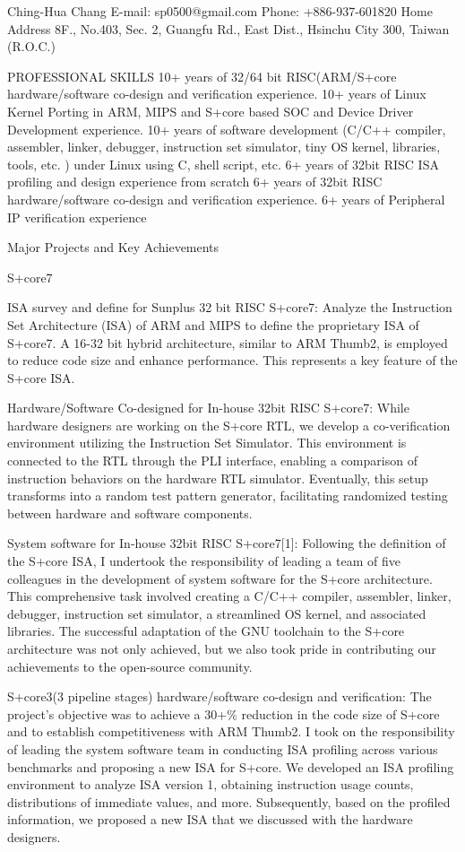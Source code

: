 
Ching-Hua Chang
E-mail: sp0500@gmail.com
Phone: +886-937-601820
Home Address
8F., No.403, Sec. 2, Guangfu Rd., East Dist., Hsinchu City 300, Taiwan (R.O.C.)




PROFESSIONAL SKILLS
10+ years of 32/64 bit RISC(ARM/S+core hardware/software co-design and verification experience.
10+ years of Linux Kernel Porting in ARM, MIPS and S+core based SOC and Device Driver Development experience.
10+ years of software development (C/C++ compiler, assembler, linker, debugger, instruction set simulator, tiny OS kernel, libraries, tools, etc. ) under Linux using C, shell script, etc.
6+ years of 32bit RISC ISA profiling and design experience from scratch
6+ years of 32bit RISC hardware/software co-design and verification experience.
6+ years of Peripheral IP verification experience



Major Projects and Key Achievements

S+core7

ISA survey and define for Sunplus 32 bit RISC S+core7:
Analyze the Instruction Set Architecture (ISA) of ARM and MIPS to define the proprietary ISA of S+core7.
A 16-32 bit hybrid architecture, similar to ARM Thumb2, is employed to reduce code size and enhance performance. This represents a key feature of the S+core ISA.


Hardware/Software Co-designed for In-house 32bit RISC S+core7:
While hardware designers are working on the S+core RTL, we develop a co-verification environment utilizing the Instruction Set Simulator.
This environment is connected to the RTL through the PLI interface, enabling a comparison of instruction behaviors on the hardware RTL simulator.
Eventually, this setup transforms into a random test pattern generator, facilitating randomized testing between hardware and software components.

System software for In-house 32bit RISC S+core7[1]:
Following the definition of the S+core ISA, I undertook the responsibility of leading a team of five colleagues in the development of system software for the S+core architecture. This comprehensive task involved creating a C/C++ compiler, assembler, linker, debugger, instruction set simulator, a streamlined OS kernel, and associated libraries.
The successful adaptation of the GNU toolchain to the S+core architecture was not only achieved, but we also took pride in contributing our achievements to the open-source community.

S+core3(3 pipeline stages) hardware/software co-design and verification:
The project's objective was to achieve a 30+\% reduction in the code size of S+core and to establish competitiveness with ARM Thumb2. I took on the responsibility of leading the system software team in conducting ISA profiling across various benchmarks and proposing a new ISA for S+core. We developed an ISA profiling environment to analyze ISA version 1, obtaining instruction usage counts, distributions of immediate values, and more. Subsequently, based on the profiled information, we proposed a new ISA that we discussed with the hardware designers.

